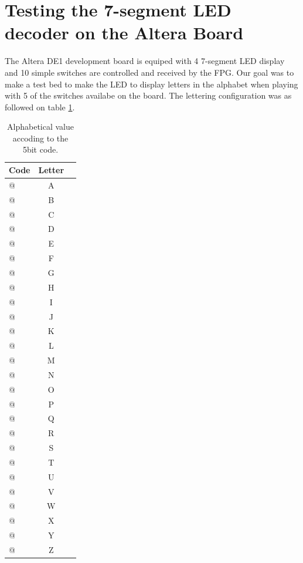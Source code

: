 \documentclass[10pt]{article}
\begin{document}
\section*{Testing the 7-segment LED decoder on the Altera Board}
The Altera DE1 development board is equiped with 4 7-segment LED display and 10 simple switches are controlled and received by the FPG. Our goal was to make a test bed to make the LED to display letters in the alphabet when playing with 5 of the switches availabe on the board. The lettering configuration was as followed on table \ref{tab:alph_label}.
\begin{table}[!htb]
    \caption{Alphabetical value accoding to the 5bit code.}
    \label{tab:alph_label}
    \centering
    \begin{tabular}{l|cc}
    \hline
    \hline
    \textbf{Code} & \textbf{Letter}\\
    \hline
        \verb@00000@ & A \\
        \verb@00001@ & B \\
        \verb@00010@ & C \\
        \verb@00011@ & D \\
        \verb@00100@ & E \\
        \verb@00101@ & F \\
        \verb@00110@ & G \\
        \verb@00111@ & H\\
        \verb@01000@ & I\\
        \verb@01001@ & J\\
        \verb@01010@ & K\\
        \verb@01011@ & L\\
        \verb@01100@ & M\\
        \verb@01101@ & N\\
        \verb@01110@ & O\\
        \verb@01111@ & P\\
        \verb@10000@ & Q\\
        \verb@10001@ & R\\
        \verb@10010@ & S\\
        \verb@10011@ & T\\
        \verb@10100@ & U\\
        \verb@10101@ & V\\
        \verb@10110@ & W\\
        \verb@10111@ & X\\
        \verb@11000@ & Y\\
        \verb@11001@ & Z\\
    \hline
    \hline
    \end{tabular}
\end{table}
\end{document}
